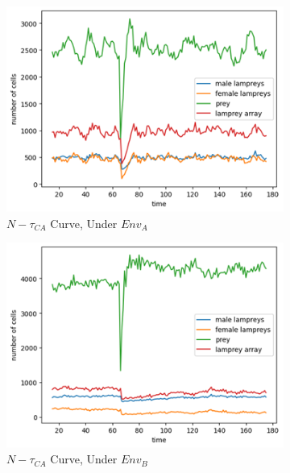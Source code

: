 \documentclass{mcmthesis}
\begin{document}
\begin{figure}[H]
  \centering
  \begin{subfigure}[b]{0.3\textwidth}
    \includegraphics[width=\textwidth]{figures/6_3_figur1.png}
    \caption{$N-\tau_{CA}$ Curve, Under $Env_{A}$}
    \label{fig:sub1}
  \end{subfigure}
  \hfill
  \begin{subfigure}[b]{0.3\textwidth}
    \includegraphics[width=\textwidth]{figures/6_3_figur2.png}
    \caption{$N-\tau_{CA}$ Curve, Under $Env_{B}$}
    \label{fig:sub2}
  \end{subfigure}
  \hfill
  \begin{subfigure}[b]{0.3\textwidth}

\end{subfigure}
\end{figure}
\end{document}
